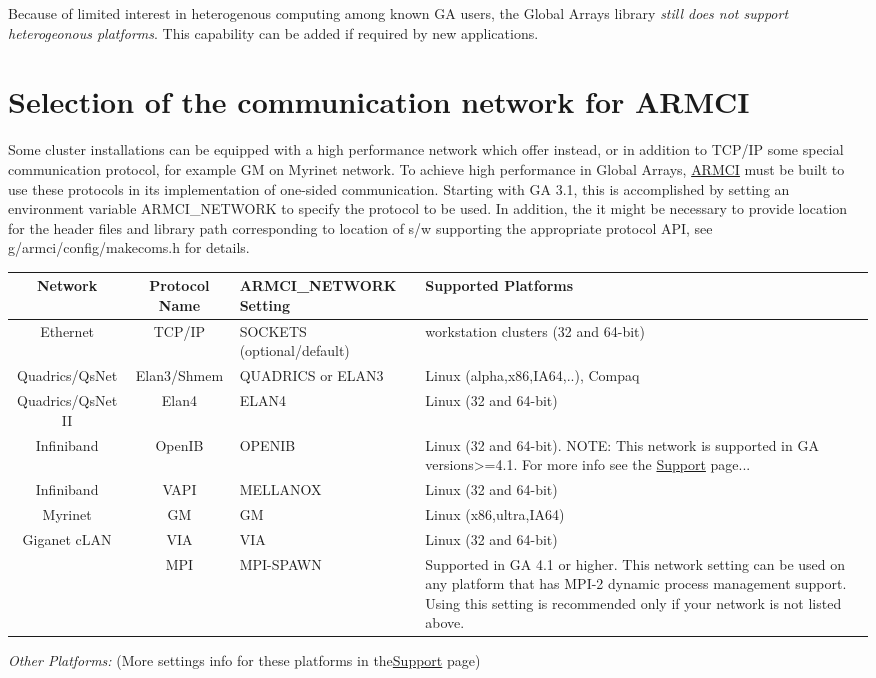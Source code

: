 Because of limited interest in heterogenous computing among known
GA users, the Global Arrays library \emph{still does not support heterogeonous
platforms}. This capability can be added if required by new applications. 


\section{Selection of the communication network for ARMCI }

Some cluster installations can be equipped with a high performance
network which offer instead, or in addition to TCP/IP some special
communication protocol, for example GM on Myrinet network. To achieve
high performance in Global Arrays, \href{https://hpc.pnl.gov/armci/}{ARMCI}
must be built to use these protocols in its implementation of one-sided
communication. Starting with GA 3.1, this is accomplished by setting
an environment variable ARMCI\_NETWORK to specify the protocol to
be used. In addition, the it might be necessary to provide location
for the header files and library path corresponding to location of
s/w supporting the appropriate protocol API, see g/armci/config/makecoms.h
for details. 

\begin{tabular}{|c|c|>{\centering}p{3cm}|>{\centering}p{3cm}|}
\hline 
Network & Protocol Name & ARMCI\_NETWORK Setting & Supported Platforms\tabularnewline
\hline
\hline 
Ethernet & TCP/IP & SOCKETS (optional/default) & workstation clusters (32 and 64-bit)\tabularnewline
\hline 
Quadrics/QsNet & Elan3/Shmem & QUADRICS or ELAN3 & Linux (alpha,x86,IA64,..), Compaq \tabularnewline
\hline 
Quadrics/QsNet II & Elan4 & ELAN4 & Linux (32 and 64-bit) \tabularnewline
\hline 
Infiniband & OpenIB & OPENIB & Linux (32 and 64-bit). NOTE: This network is supported in GA versions>=4.1.
For more info see the \href{http://www.emsl.pnl.gov/docs/global/support.html}{Support}
page...\tabularnewline
\hline 
Infiniband & VAPI & MELLANOX & Linux (32 and 64-bit)\tabularnewline
\hline 
Myrinet & GM & GM & Linux (x86,ultra,IA64)\tabularnewline
\hline 
Giganet cLAN & VIA & VIA & Linux (32 and 64-bit)\tabularnewline
\hline 
 & MPI & MPI-SPAWN & Supported in GA 4.1 or higher. This network setting can be used on
any platform that has MPI-2 dynamic process management support. Using
this setting is recommended only if your network is not listed above.\tabularnewline
\hline
\end{tabular}

\emph{Other Platforms:} (More settings info for these platforms in
the\href{http://www.emsl.pnl.gov/docs/global/support.html}{Support}
page) 

